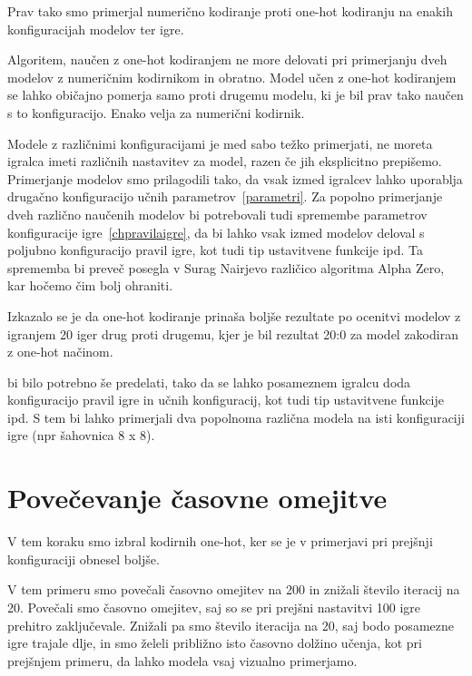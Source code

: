 \documentclass[a4paper, 12pt]{book}
\begin{document}
Prav tako smo primerjal numerično kodiranje proti one-hot kodiranju na enakih konfiguracijah modelov ter igre.

Algoritem, naučen z one-hot kodiranjem ne more delovati pri primerjanju dveh modelov z numeričnim kodirnikom in obratno. 
Model učen z one-hot kodiranjem se lahko običajno pomerja samo proti drugemu modelu, ki je bil prav tako naučen s to konfiguracijo.
Enako velja za numerični kodirnik.

Modele z različnimi konfiguracijami je med sabo težko primerjati, ne moreta igralca imeti različnih nastavitev za model, razen če jih eksplicitno prepišemo.
Primerjanje modelov smo prilagodili tako, da vsak izmed igralcev lahko uporablja drugačno konfiguracijo učnih parametrov~\ref{parametri}.
Za popolno primerjanje dveh različno naučenih modelov bi potrebovali tudi spremembe parametrov konfiguracije igre~\ref{chpravilaigre}, da bi lahko vsak izmed modelov deloval s poljubno konfiguracijo pravil igre, kot tudi tip ustavitvene funkcije ipd.
Ta sprememba bi preveč posegla v Surag Nairjevo različico algoritma Alpha Zero, kar hočemo čim bolj ohraniti.

Izkazalo se je da one-hot kodiranje prinaša boljše rezultate po ocenitvi modelov z igranjem 20 iger drug proti drugemu, kjer je bil rezultat 20:0 za model zakodiran z one-hot načinom.



 bi bilo potrebno še predelati, tako da se lahko posameznem igralcu doda konfiguracijo pravil igre in učnih konfiguracij, kot tudi tip ustavitvene funkcije ipd.
S tem bi lahko primerjali dva popolnoma različna modela na isti konfiguraciji igre (npr šahovnica 8 x 8).

\section{Povečevanje časovne omejitve}
\label{resultSecond}
V tem koraku smo izbral kodirnih one-hot, ker se je v primerjavi pri prejšnji konfiguraciji obnesel boljše.

V tem primeru smo povečali časovno omejitev na 200 in znižali število iteracij na 20.
Povečali smo časovno omejitev, saj so se pri prejšni nastavitvi 100 igre prehitro zaključevale.
Znižali pa smo število iteracija na 20, saj bodo posamezne igre trajale dlje, in smo želeli približno isto časovno dolžino učenja, kot pri prejšnjem primeru, da lahko modela vsaj vizualno primerjamo.
\end{document}
